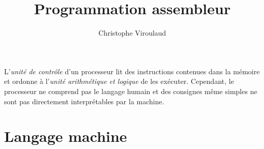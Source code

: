 \documentclass[svgnames,11pt]{beamer}
\author[]{Christophe Viroulaud}
\title{Programmation assembleur}
\date{}
\institute{Première - NSI}
\begin{document}
\begin{frame}
    \titlepage
\end{frame}
\begin{frame}
    \frametitle{}

    L'\emph{unité de contrôle} d'un processeur lit des instructions contenues dans la mémoire et ordonne à l'\emph{unité arithmétique et logique} de les exécuter. Cependant, le processeur ne comprend pas le langage humain et des consignes même simples ne sont pas directement interprétables par la machine.

\end{frame}
\begin{frame}
    \frametitle{}

    \begin{center}
    \end{center}

\end{frame}
\section{Langage machine}
\end{document}
